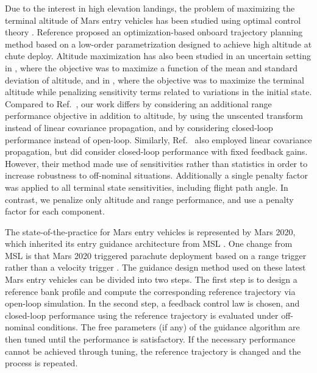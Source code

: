 \documentclass[journal ]{new-aiaa}
\begin{document}
Due to the interest in high elevation landings, the problem of maximizing the terminal altitude of Mars entry vehicles has been studied using optimal control theory 
\cite{AltitudeOptimization,AltitudeOptimizationIndirect}. Reference \cite{GuangfeiDissertation} proposed an optimization-based onboard trajectory planning method based on a low-order parametrization designed to achieve high altitude at chute deploy. 
Altitude maximization has also been studied in an uncertain setting in \cite{AltitudeUnderUncertainty}, where the objective was to maximize a function of the mean and standard deviation of altitude, and in \cite{MarsEntryDesensitized}, where the objective was to maximize the terminal altitude while penalizing sensitivity terms related to variations in the initial state. Compared to Ref.~\cite{AltitudeUnderUncertainty}, our work differs by considering an additional range performance objective in addition to altitude, by using the unscented transform instead of linear covariance propagation, and by considering closed-loop performance instead of open-loop. Similarly, Ref.~\cite{MarsEntryDesensitized} also employed linear covariance propagation, but did consider closed-loop performance with fixed feedback gains. However, their method made use of sensitivities\cite{Desensitized} rather than statistics in order to increase robustness to off-nominal situations. Additionally a single penalty factor was applied to all terminal state sensitivities, including flight path angle. In contrast, we penalize only altitude and range performance, and use a penalty factor for each component. 

The state-of-the-practice for Mars entry vehicles is represented by Mars 2020, which inherited its entry guidance architecture from MSL \cite{M2020_EDL}. One change from MSL is that Mars 2020 triggered parachute deployment based on a range trigger rather than a velocity trigger \cite{TriggerComparison2020}.
The guidance design method used on these latest Mars entry vehicles \cite{MSL_EDL2,M2020_EDL} can be divided into two steps. The first step is to design a reference bank profile and compute the corresponding reference trajectory via open-loop simulation. In the second step, a feedback control law is chosen, and closed-loop performance using the reference trajectory is evaluated under off-nominal conditions. The free parameters (if any) of the guidance algorithm are then tuned until the performance is satisfactory. If the necessary performance cannot be achieved through tuning, the reference trajectory is changed and the process is repeated. 
\end{document}
